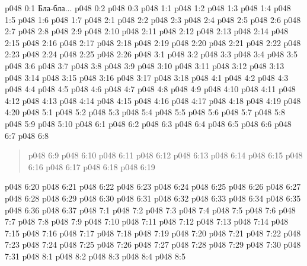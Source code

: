 \author{Архангел}
\vs p048 0:1  Бла-бла...
\vs p048 0:2 
\vs p048 0:3 
\vs p048 1:1 
\vs p048 1:2 
\vs p048 1:3 
\vs p048 1:4 \pc 
\vs p048 1:5 
\vs p048 1:6 
\vs p048 1:7 \pc 
{}
\vs p048 2:1 
\vs p048 2:2 
\vs p048 2:3 
\vs p048 2:4 
\vs p048 2:5 
\vs p048 2:6 
\vs p048 2:7 
\vs p048 2:8 
\vs p048 2:9 
\vs p048 2:10 
\vs p048 2:11 \pc 
\vs p048 2:12 
\vs p048 2:13 
\vs p048 2:14 
\vs p048 2:15 
\vs p048 2:16 
\vs p048 2:17 
\vs p048 2:18 
\vs p048 2:19 
\vs p048 2:20 
\vs p048 2:21 
\vs p048 2:22 
\vs p048 2:23 
\vs p048 2:24 
\vs p048 2:25 
\vs p048 2:26 
\vs p048 3:1 
\vs p048 3:2 
\vs p048 3:3 
\vs p048 3:4 \pc 
\vs p048 3:5 
\vs p048 3:6 \pc 
\vs p048 3:7 
\vs p048 3:8 
\vs p048 3:9 
\vs p048 3:10 
\vs p048 3:11 
\vs p048 3:12 
\vs p048 3:13 
\vs p048 3:14 
\vs p048 3:15 
\vs p048 3:16 \pc 
\vs p048 3:17 
\vs p048 3:18 
\vs p048 4:1 
\vs p048 4:2 
\vs p048 4:3 
\vs p048 4:4 \pc 
\vs p048 4:5 
\vs p048 4:6 
\vs p048 4:7 
\vs p048 4:8 \pc 
\vs p048 4:9 
\vs p048 4:10 \pc 
\vs p048 4:11 
\vs p048 4:12 
\vs p048 4:13 
\vs p048 4:14 \pc 
\vs p048 4:15 
\vs p048 4:16 \pc 
\vs p048 4:17 
\vs p048 4:18 
\vs p048 4:19 \pc 
\vs p048 4:20 
\vs p048 5:1 
\vs p048 5:2 
\vs p048 5:3 
\vs p048 5:4 \pc 
\vs p048 5:5 
\vs p048 5:6 
\vs p048 5:7 \pc 
\vs p048 5:8 
\vs p048 5:9 \pc 
\vs p048 5:10 
\vs p048 6:1 
\vs p048 6:2 
\vs p048 6:3 \pc 
\vs p048 6:4 
\vs p048 6:5 
\vs p048 6:6 
\vs p048 6:7 \pc 
\vs p048 6:8 
\begin{quote}
\vs p048 6:9 
\vs p048 6:10 
\vs p048 6:11 
\vs p048 6:12 
\vs p048 6:13 
\vs p048 6:14 
\vs p048 6:15 
\vs p048 6:16 
\vs p048 6:17 
\vs p048 6:18 
\vs p048 6:19 
\end{quote}
\vs p048 6:20 \pc 
\vs p048 6:21 
\vs p048 6:22 
\vs p048 6:23 \pc 
\vs p048 6:24 
\vs p048 6:25 
\vs p048 6:26 
\vs p048 6:27 
\vs p048 6:28 
\vs p048 6:29 
\vs p048 6:30 
\vs p048 6:31 
\vs p048 6:32 
\vs p048 6:33 
\vs p048 6:34 
\vs p048 6:35 
\vs p048 6:36 
\vs p048 6:37 
\vs p048 7:1 
\vs p048 7:2 
\vs p048 7:3 
\vs p048 7:4 
\vs p048 7:5 
\vs p048 7:6 
\vs p048 7:7 
\vs p048 7:8 
\vs p048 7:9 
\vs p048 7:10 
\vs p048 7:11 
\vs p048 7:12 
\vs p048 7:13 
\vs p048 7:14 
\vs p048 7:15 
\vs p048 7:16 
\vs p048 7:17 
\vs p048 7:18 
\vs p048 7:19 
\vs p048 7:20 
\vs p048 7:21 
\vs p048 7:22 
\vs p048 7:23 
\vs p048 7:24 
\vs p048 7:25 
\vs p048 7:26 
\vs p048 7:27 
\vs p048 7:28 
\vs p048 7:29 
\vs p048 7:30 
\vs p048 7:31 \pc 
{}
\vs p048 8:1 
\vs p048 8:2 
\vs p048 8:3 
\vs p048 8:4 
\vsetoff
\vs p048 8:5 
\quizlink
